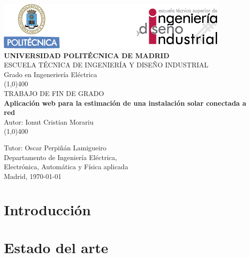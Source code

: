 \documentclass[11pt]{report}
\begin{document}
\begin{titlepage}



\begin{center}
	\includegraphics[scale=1]{cabecera}\\
	\vspace*{1cm}
	\Large{\textbf{\MakeUppercase{Universidad Politécnica de Madrid}}}\\[3mm]
	\Large{{\MakeUppercase{Escuela técnica de ingeniería y diseño industrial}}}\\[3mm]
	\Large {Grado en Ingeneriería Eléctrica}\\
	\vfill
	\line(1,0){400}\\
	\Large{{\MakeUppercase{Trabajo de fin de grado}}}\\
	\Huge{\textbf{Aplicación web para la estimación de una instalación solar conectada a red}}\\[5mm]
	\Large{Autor: Ionut Cristian Morariu}\\
	\line(1,0){400}\\
	\vfill
\end{center}
\begin{flushright}
\Large {Tutor: Oscar Perpiñán Lamigueiro}\\[3mm]
\Large{Departamento de Ingeniería Eléctrica,\\ Electrónica, Automática y Física aplicada}\\[10mm]
Madrid, \today
\end{flushright}

\end{titlepage}

\renewcommand{\baselinestretch}{1.5} %
\renewcommand{\labelitemi}{\textbullet}

\tableofcontents
\thispagestyle{empty}
\clearpage

\setcounter{page}{1}


\chapter{Introducción}


\chapter{Estado del arte}

\end{document}
